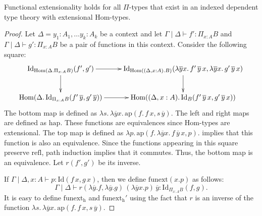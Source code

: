 \documentclass[reqno]{mscs}
\newcommand{\fs}[1]{\mathrm{#1}}
\newcommand{\Hom}{\fs{Hom}}
\newcommand{\Id}{\fs{Id}}
\newcommand{\refl}{\fs{refl}}
\newcommand{\pmap}{\fs{ap}}
\numberwithin{figure}{section}
\begin{document}
\begin{prop}
Functional extensionality holds for all $\Pi$-types that exist in an indexed dependent type theory with extensional $\Hom$-types.
\end{prop}
\begin{proof}
Let $\Delta = y_1 : A_1, \ldots y_k : A_k$ be a context and let $\Gamma \mid \Delta \vdash f' : \Pi_{x : A} B$ and $\Gamma \mid \Delta \vdash g' : \Pi_{x : A} B$ be a pair of functions in this context.
Consider the following square:
\[ \xymatrix{ \Id_{\Hom(\Delta. \Pi_{x : A} B)}(f',g') \ar[r] \ar[d] & \Id_{\Hom((\Delta, x : A). B)}(\lambda \overline{y} x.\,f'\,\overline{y}\,x, \lambda \overline{y} x.\,g'\,\overline{y}\,x) \ar[d] \\
              \Hom(\Delta.\,\Id_{\Pi_{x : A} B}(f'\,\overline{y}, g'\,\overline{y})) \ar[r] & \Hom((\Delta, x : A).\,\Id_B(f'\,\overline{y}\,x, g'\,\overline{y}\,x))
            } \]
The bottom map is defined as $\lambda s.\,\lambda \overline{y} x.\,\pmap(f.\,f\,x,s\,\overline{y})$.
The left and right maps are defined as $\fs{hap}$.
These functions are equivalences since $\Hom$-types are extensional.
The top map is defined as $\lambda p.\,\pmap(f.\,\lambda \overline{y} x.\,f\,\overline{y}\,x,p)$.
 implies that this function is also an equivalence.
Since the functions appearing in this square preserve $\refl$, path induction implies that it commutes.
Thus, the bottom map is an equivalence.
Let $r(f',g')$ be its inverse.

If $\Gamma \mid \Delta, x : A \vdash p : \Id(f\,x,g\,x)$, then we define $\fs{funext}(x.p)$ as follows:
\[ \Gamma \mid \Delta \vdash r(\lambda \overline{y}.f,\lambda \overline{y}.g)\,(\lambda \overline{y} x.p)\,\overline{y} : \Id_{\Pi_{x : A} B}(f,g). \]
It is easy to define $\fs{funext_h}$ and $\fs{funext_h'}$ using the fact that $r$ is an inverse of the function $\lambda s.\,\lambda \overline{y} x.\,\pmap(f.\,f\,x,s\,\overline{y})$.
\end{proof}
\end{document}
